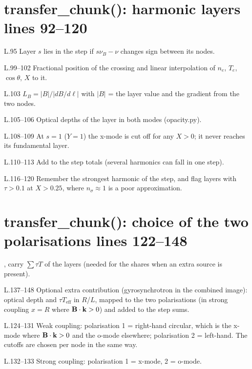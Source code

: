 \section*{\normalsize transfer\_chunk(): harmonic layers \hfill{\small\mdseries\color{gray}lines 92--120}}

\begin{lines}
\item[L.95] Layer $s$ lies in the step if $s\nu_B-\nu$ changes sign between its nodes.
\item[L.99–102] Fractional position of the crossing and linear interpolation of $n_e$, $T_e$, $\cos\theta$, $X$ to it.
\item[L.103] $L_B=|B|/|dB/d\ell|$ with $|B|$ = the layer value and the gradient from the two nodes.
\item[L.105–106] Optical depths of the layer in both modes (opacity.py).
\item[L.108–109] At $s=1$ ($Y=1$) the x-mode is cut off for any $X>0$; it never reaches its fundamental layer.
\item[L.110–113] Add to the step totals (several harmonics can fall in one step).
\item[L.116–120] Remember the strongest harmonic of the step, and flag layers with $\tau>0.1$ at $X>0.25$, where $n_\sigma\approx1$ is a poor approximation.
\end{lines}
\section*{\normalsize transfer\_chunk(): choice of the two polarisations \hfill{\small\mdseries\color{gray}lines 122--148}}

,  carry $\sum\tau T$ of the layers (needed for the shares when an extra source is present).

\begin{lines}
\item[L.137–148] Optional extra contribution (gyrosynchrotron in the combined image): optical depth and $\tau T_\text{eff}$ in $R$/$L$, mapped to the two polarisations (in strong coupling $x=R$ where $\mathbf{B}\cdot\mathbf{k}>0$) and added to the step sums.
\item[L.124–131] Weak coupling: polarisation 1 = right-hand circular, which is the x-mode where $\mathbf{B}\cdot\mathbf{k}>0$ and the o-mode elsewhere; polarisation 2 = left-hand. The cutoffs are chosen per node in the same way.
\item[L.132–133] Strong coupling: polarisation 1 = x-mode, 2 = o-mode.
\end{lines}
